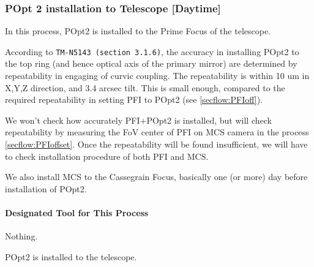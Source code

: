 \subsubsection{POpt 2 installation to Telescope [Daytime]}\label{secflow:PFIinstall}
In this process,  POpt2 is installed to the Prime Focus of the telescope.

According to {\tt TM-N5143 (section 3.1.6)}, the accuracy in installing POpt2 to the top ring (and hence optical axis of the primary mirror) are determined by repeatability in engaging of curvic coupling.
The repeatability is within 10 um in X,Y,Z direction, and 3.4 arcsec tilt.
This is small enough, compared to the required repeatability in setting PFI to POpt2 (see \ref{secflow:PFIoff}).

We won't check how accurately PFI$+$POpt2 is installed, but will check repeatability by measuring the FoV center of PFI on MCS camera in the process \ref{secflow:PFIoffset}.
Once the repeatability will be found insufficient, we will have to check installation procedure of both PFI and MCS.

We also install MCS to the Cassegrain Focus, basically one (or more) day before installation of POpt2.

\paragraph{Designated Tool for This Process}
Nothing.

\begin{itembox}[l]{}
POpt2 is installed to the telescope. 

\end{itembox}